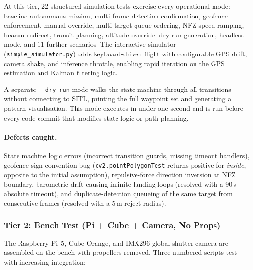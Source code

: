 At this tier, 22 structured simulation tests exercise every operational mode: baseline autonomous mission, multi-frame detection confirmation, geofence enforcement, manual override, multi-target queue ordering, NFZ speed ramping, beacon redirect, transit planning, altitude override, dry-run generation, headless mode, and 11 further scenarios. The interactive simulator (\texttt{simple\_simulator.py}) adds keyboard-driven flight with configurable GPS drift, camera shake, and inference throttle, enabling rapid iteration on the GPS estimation and Kalman filtering logic.

A separate \texttt{-{}-dry-run} mode walks the state machine through all transitions without connecting to SITL, printing the full waypoint set and generating a pattern visualisation. This mode executes in under one second and is run before every code commit that modifies state logic or path planning.

\paragraph{Defects caught.} State machine logic errors (incorrect transition guards, missing timeout handlers), geofence sign-convention bug (\texttt{cv2.pointPolygonTest} returns positive for \emph{inside}, opposite to the initial assumption), repulsive-force direction inversion at NFZ boundary, barometric drift causing infinite landing loops (resolved with a 90\,s absolute timeout), and duplicate-detection queueing of the same target from consecutive frames (resolved with a 5\,m reject radius).

\subsubsection{Tier 2: Bench Test (Pi + Cube + Camera, No Props)}

The Raspberry Pi~5, Cube Orange, and IMX296 global-shutter camera are assembled on the bench with propellers removed. Three numbered scripts test with increasing integration:

